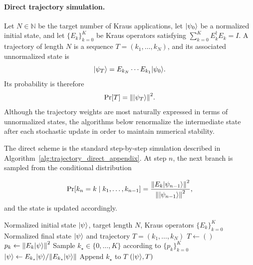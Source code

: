 \documentclass[showpacs,amsmath,amssymb,twocolumn,prx,superscriptaddress,10pt,aps,nofootinbib]{revtex4-2}
\DeclarePairedDelimiter\ket{|}{\rangle}
\begin{document}
\paragraph{Direct trajectory simulation.} Let $N\in\mathbb{N}$ be the target number of Kraus applications, let $\ket{\psi_0}$ be a normalized initial state, and let $\{E_k\}_{k=0}^{K}$ be Kraus operators satisfying $\sum_{k=0}^{K} E_k^{\dagger} E_k = I$. A trajectory of length $N$ is a sequence $T=(k_1,\ldots,k_N)$, and its associated unnormalized state is
\begin{equation}
    \ket{\psi_T} = E_{k_N} \cdots E_{k_1} \ket{\psi_0}.
\end{equation}
Its probability is therefore
\begin{equation}
\label{eq:trajectory_probability_appendix}
    \Pr[T] = \norm{\ket{\psi_T}}^2.
\end{equation}
Although the trajectory weights are most naturally expressed in terms of unnormalized states, the algorithms below renormalize the intermediate state after each stochastic update in order to maintain numerical stability.

The direct scheme is the standard step-by-step simulation described in Algorithm~\ref{alg:trajectory_direct_appendix}. At step $n$, the next branch is sampled from the conditional distribution

\begin{equation}
    \Pr[k_n = k \mid k_1,\ldots,k_{n-1}] = \frac{\norm{E_k \ket{\psi_{n-1}}}^2}{\norm{\ket{\psi_{n-1}}}^2},
\end{equation}
and the state is updated accordingly.

\begin{algorithm}[H]
\caption{Direct trajectory simulation}
\label{alg:trajectory_direct_appendix}
\small
\begin{algorithmic}[1]
\Require Normalized initial state $\ket{\psi}$, target length $N$, Kraus operators $\{E_k\}_{k=0}^{K}$
\Ensure Normalized final state $\ket{\psi}$ and trajectory $T=(k_1,\ldots,k_N)$
\State $T \gets ()$
        \State $p_k \gets \norm{E_k\ket{\psi}}^2$
    \EndFor
    \State Sample $k_\star \in \{0,\ldots,K\}$ according to $\{p_k\}_{k=0}^{K}$
    \State $\ket{\psi} \gets E_{k_\star}\ket{\psi} / \norm{E_{k_\star}\ket{\psi}}$
    \State Append $k_\star$ to $T$
\EndFor
\State \Return $(\ket{\psi}, T)$
\end{algorithmic}
\end{algorithm}
\end{document}
